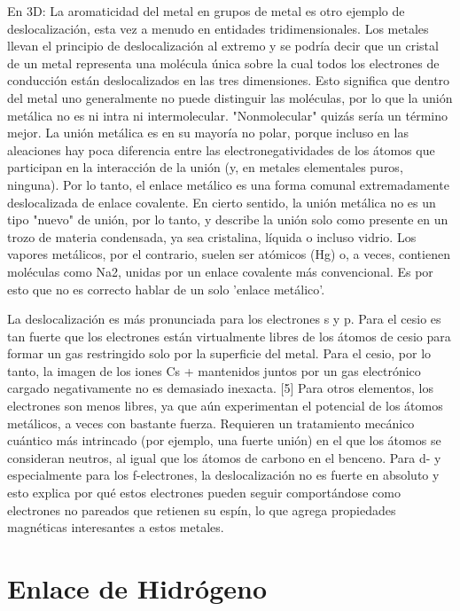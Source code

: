 \documentclass{article}
\begin{document}
En 3D: La aromaticidad del metal en grupos de metal es otro ejemplo de deslocalización, esta vez a menudo en entidades tridimensionales. Los metales llevan el principio de deslocalización al extremo y se podría decir que un cristal de un metal representa una molécula única sobre la cual todos los electrones de conducción están deslocalizados en las tres dimensiones. Esto significa que dentro del metal uno generalmente no puede distinguir las moléculas, por lo que la unión metálica no es ni intra ni intermolecular. "Nonmolecular" quizás sería un término mejor. La unión metálica es en su mayoría no polar, porque incluso en las aleaciones hay poca diferencia entre las electronegatividades de los átomos que participan en la interacción de la unión (y, en metales elementales puros, ninguna). Por lo tanto, el enlace metálico es una forma comunal extremadamente deslocalizada de enlace covalente. En cierto sentido, la unión metálica no es un tipo "nuevo" de unión, por lo tanto, y describe la unión solo como presente en un trozo de materia condensada, ya sea cristalina, líquida o incluso vidrio. Los vapores metálicos, por el contrario, suelen ser atómicos (Hg) o, a veces, contienen moléculas como Na2, unidas por un enlace covalente más convencional. Es por esto que no es correcto hablar de un solo 'enlace metálico'.

La deslocalización es más pronunciada para los electrones s y p. Para el cesio es tan fuerte que los electrones están virtualmente libres de los átomos de cesio para formar un gas restringido solo por la superficie del metal. Para el cesio, por lo tanto, la imagen de los iones Cs + mantenidos juntos por un gas electrónico cargado negativamente no es demasiado inexacta. [5] Para otros elementos, los electrones son menos libres, ya que aún experimentan el potencial de los átomos metálicos, a veces con bastante fuerza. Requieren un tratamiento mecánico cuántico más intrincado (por ejemplo, una fuerte unión) en el que los átomos se consideran neutros, al igual que los átomos de carbono en el benceno. Para d- y especialmente para los f-electrones, la deslocalización no es fuerte en absoluto y esto explica por qué estos electrones pueden seguir comportándose como electrones no pareados que retienen su espín, lo que agrega propiedades magnéticas interesantes a estos metales.


\section{Enlace de Hidrógeno}
\end{document}
